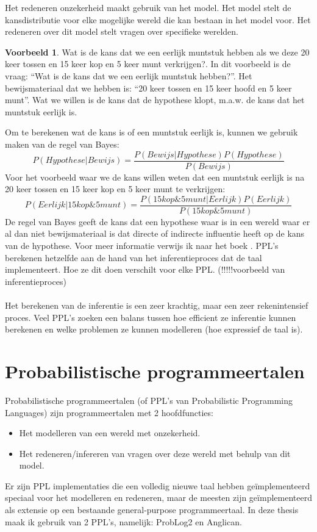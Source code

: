 \documentclass[12pt,a4paper,oneside]{book}
\theoremstyle{definition}
\newtheorem{exmp}{Voorbeeld}[section]
\newcommand{\quotes}[1]{``#1''}
\begin{document}
Het redeneren onzekerheid maakt gebruik van het model. Het model stelt de kansdistributie voor elke mogelijke wereld die kan bestaan in het model voor. Het redeneren over dit model stelt vragen over specifieke werelden. 
\begin{exmp}
Wat is de kans dat we een eerlijk muntstuk hebben als we deze 20 keer tossen en 15 keer kop en 5 keer munt verkrijgen?. In dit voorbeeld is de vraag: \quotes{Wat is de kans dat we een eerlijk muntstuk hebben?}. Het bewijsmateriaal dat we hebben is: \quotes{20 keer tossen en 15 keer hoofd en 5 keer munt}. Wat we willen is de kans dat de hypothese klopt, m.a.w. de kans dat het muntstuk eerlijk is.
\end{exmp}
Om te berekenen wat de kans is of een muntstuk eerlijk is, kunnen we gebruik maken van de regel van Bayes:
\begin{equation} 
	\label{eq:bayesrule}
	P(Hypothese|Bewijs) = \frac{P(Bewijs|Hypothese)P(Hypothese)}{P(Bewijs)}
\end{equation}
Voor het voorbeeld waar we de kans willen weten dat een muntstuk eerlijk is na 20 keer tossen en 15 keer kop en 5 keer munt te verkrijgen:
\begin{equation} 
	\label{eq:bayesruleexample}
	P(Eerlijk|15kop\&5munt) = \frac{P(15kop\&5munt|Eerlijk)P(Eerlijk)}{P(15kop\&5munt)}
\end{equation}
De regel van Bayes geeft de kans dat een hypothese waar is in een wereld waar er al dan niet bewijsmateriaal is dat directe of indirecte influentie heeft op de kans van de hypothese. Voor meer informatie verwijs ik naar het boek \cite{barberBRML2012}. PPL's berekenen hetzelfde aan de hand van het inferentieproces dat de taal implementeert. Hoe ze dit doen verschilt voor elke PPL. (!!!!!voorbeeld van inferentieproces)
\\\\
Het berekenen van de inferentie is een zeer krachtig, maar een zeer rekenintensief proces. Veel PPL's zoeken een balans tussen hoe efficient ze inferentie kunnen berekenen en welke problemen ze kunnen modelleren (hoe expressief de taal is).

\section{Probabilistische programmeertalen}
Probabilistische programmeertalen (of PPL's van Probabilistic Programming Languages) zijn programmeertalen met 2 hoofdfuncties:
\begin{itemize}
  \item Het modelleren van een wereld met onzekerheid.
  \item Het redeneren/infereren van vragen over deze wereld met behulp van dit model.
\end{itemize}
Er zijn PPL implementaties die een volledig nieuwe taal hebben geïmplementeerd speciaal voor het modelleren en redeneren, maar de meesten zijn geïmplementeerd als extensie op een bestaande general-purpose programmeertaal. In deze thesis maak ik gebruik van 2 PPL’s, namelijk: ProbLog2 en Anglican.
\end{document}
